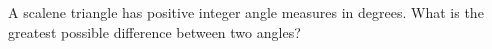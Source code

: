 A scalene triangle has positive integer angle measures in degrees. What is the greatest possible difference between two angles?
